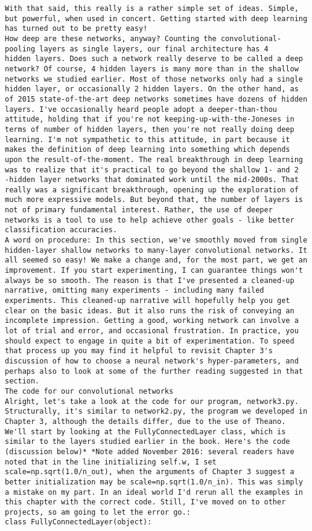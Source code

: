 \begin{lstlisting}
With that said, this really is a rather simple set of ideas. Simple, but powerful, when used in concert. Getting started with deep learning has turned out to be pretty easy!
How deep are these networks, anyway? Counting the convolutional-pooling layers as single layers, our final architecture has 4
hidden layers. Does such a network really deserve to be called a deep network? Of course, 4 hidden layers is many more than in the shallow networks we studied earlier. Most of those networks only had a single hidden layer, or occasionally 2 hidden layers. On the other hand, as of 2015 state-of-the-art deep networks sometimes have dozens of hidden layers. I've occasionally heard people adopt a deeper-than-thou attitude, holding that if you're not keeping-up-with-the-Joneses in terms of number of hidden layers, then you're not really doing deep learning. I'm not sympathetic to this attitude, in part because it makes the definition of deep learning into something which depends upon the result-of-the-moment. The real breakthrough in deep learning was to realize that it's practical to go beyond the shallow 1- and 2
-hidden layer networks that dominated work until the mid-2000s. That really was a significant breakthrough, opening up the exploration of much more expressive models. But beyond that, the number of layers is not of primary fundamental interest. Rather, the use of deeper networks is a tool to use to help achieve other goals - like better classification accuracies.
A word on procedure: In this section, we've smoothly moved from single hidden-layer shallow networks to many-layer convolutional networks. It all seemed so easy! We make a change and, for the most part, we get an improvement. If you start experimenting, I can guarantee things won't always be so smooth. The reason is that I've presented a cleaned-up narrative, omitting many experiments - including many failed experiments. This cleaned-up narrative will hopefully help you get clear on the basic ideas. But it also runs the risk of conveying an incomplete impression. Getting a good, working network can involve a lot of trial and error, and occasional frustration. In practice, you should expect to engage in quite a bit of experimentation. To speed that process up you may find it helpful to revisit Chapter 3's discussion of how to choose a neural network's hyper-parameters, and perhaps also to look at some of the further reading suggested in that section.
The code for our convolutional networks
Alright, let's take a look at the code for our program, network3.py. Structurally, it's similar to network2.py, the program we developed in Chapter 3, although the details differ, due to the use of Theano. We'll start by looking at the FullyConnectedLayer class, which is similar to the layers studied earlier in the book. Here's the code (discussion below)* *Note added November 2016: several readers have noted that in the line initializing self.w, I set scale=np.sqrt(1.0/n_out), when the arguments of Chapter 3 suggest a better initialization may be scale=np.sqrt(1.0/n_in). This was simply a mistake on my part. In an ideal world I'd rerun all the examples in this chapter with the correct code. Still, I've moved on to other projects, so am going to let the error go.:
class FullyConnectedLayer(object):


\end{lstlisting}
